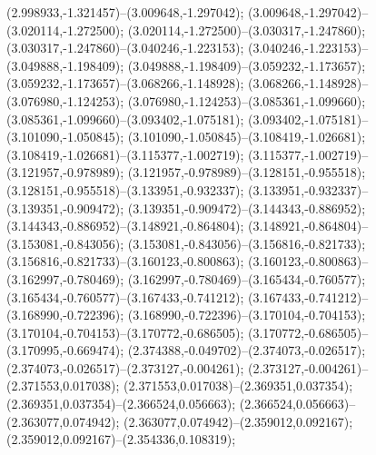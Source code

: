  (2.998933,-1.321457)--(3.009648,-1.297042);
 (3.009648,-1.297042)--(3.020114,-1.272500);
 (3.020114,-1.272500)--(3.030317,-1.247860);
 (3.030317,-1.247860)--(3.040246,-1.223153);
 (3.040246,-1.223153)--(3.049888,-1.198409);
 (3.049888,-1.198409)--(3.059232,-1.173657);
 (3.059232,-1.173657)--(3.068266,-1.148928);
 (3.068266,-1.148928)--(3.076980,-1.124253);
 (3.076980,-1.124253)--(3.085361,-1.099660);
 (3.085361,-1.099660)--(3.093402,-1.075181);
 (3.093402,-1.075181)--(3.101090,-1.050845);
 (3.101090,-1.050845)--(3.108419,-1.026681);
 (3.108419,-1.026681)--(3.115377,-1.002719);
 (3.115377,-1.002719)--(3.121957,-0.978989);
 (3.121957,-0.978989)--(3.128151,-0.955518);
 (3.128151,-0.955518)--(3.133951,-0.932337);
 (3.133951,-0.932337)--(3.139351,-0.909472);
 (3.139351,-0.909472)--(3.144343,-0.886952);
 (3.144343,-0.886952)--(3.148921,-0.864804);
 (3.148921,-0.864804)--(3.153081,-0.843056);
 (3.153081,-0.843056)--(3.156816,-0.821733);
 (3.156816,-0.821733)--(3.160123,-0.800863);
 (3.160123,-0.800863)--(3.162997,-0.780469);
 (3.162997,-0.780469)--(3.165434,-0.760577);
 (3.165434,-0.760577)--(3.167433,-0.741212);
 (3.167433,-0.741212)--(3.168990,-0.722396);
 (3.168990,-0.722396)--(3.170104,-0.704153);
 (3.170104,-0.704153)--(3.170772,-0.686505);
 (3.170772,-0.686505)--(3.170995,-0.669474);
 (2.374388,-0.049702)--(2.374073,-0.026517);
 (2.374073,-0.026517)--(2.373127,-0.004261);
 (2.373127,-0.004261)--(2.371553,0.017038);
 (2.371553,0.017038)--(2.369351,0.037354);
 (2.369351,0.037354)--(2.366524,0.056663);
 (2.366524,0.056663)--(2.363077,0.074942);
 (2.363077,0.074942)--(2.359012,0.092167);
 (2.359012,0.092167)--(2.354336,0.108319);
